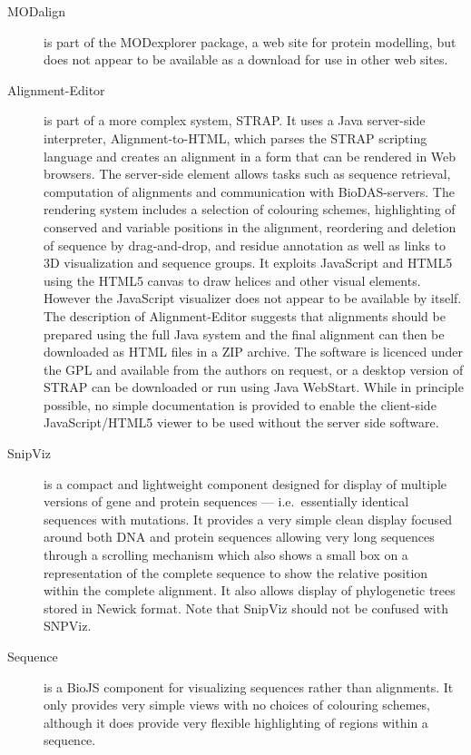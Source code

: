 \documentclass{article}
\begin{document}
\begin{description}
\item[MODalign] is part of the MODexplorer
  package\cite{kosinski:2013}, a web site for protein modelling, but
  does not appear to be available as a download for use in other web
  sites.
\item[Alignment-Editor] is part of a more complex system, STRAP. It
  uses a Java server-side interpreter,
  Alignment-to-HTML\cite{gille:2014}, which parses the STRAP scripting
  language and creates an alignment in a form that can be rendered in
  Web browsers. The server-side element allows tasks such as sequence
  retrieval, computation of alignments and communication with
  BioDAS-servers. The rendering system includes a selection of
  colouring schemes, highlighting of conserved and variable positions
  in the alignment, reordering and deletion of sequence by
  drag-and-drop, and residue annotation as well as links to 3D
  visualization and sequence groups. It exploits JavaScript and HTML5
  using the HTML5 canvas to draw helices and other visual elements.
  However the JavaScript visualizer does not appear to be available by
  itself. The description of Alignment-Editor\cite{gille:2014aa}
  suggests that alignments should be prepared using the full Java
  system and the final alignment can then be downloaded as HTML files
  in a ZIP archive. The software is licenced under the GPL and
  available from the authors on request, or a desktop version of STRAP
  can be downloaded or run using Java WebStart. While in principle
  possible, no simple documentation is provided to enable the
  client-side JavaScript/HTML5 viewer to be used without the server
  side software.
\item[SnipViz] is a compact and lightweight component designed for
  display of multiple versions of gene and protein sequences --- i.e.\
  essentially identical sequences with mutations.  It provides a very
  simple clean display focused around both DNA and protein sequences
  allowing very long sequences through a scrolling mechanism which
  also shows a small box on a representation of the complete sequence
  to show the relative position within the complete alignment.  It
  also allows display of phylogenetic trees stored in Newick
  format. Note that SnipViz should not be confused with
  SNPViz\cite{langewisch:snpviz}.
\item[Sequence] is a BioJS component for visualizing sequences rather
  than alignments.  It only provides very simple views with no choices
  of colouring schemes, although it does provide very flexible
  highlighting of regions within a sequence.
\end{description}
\end{document}
